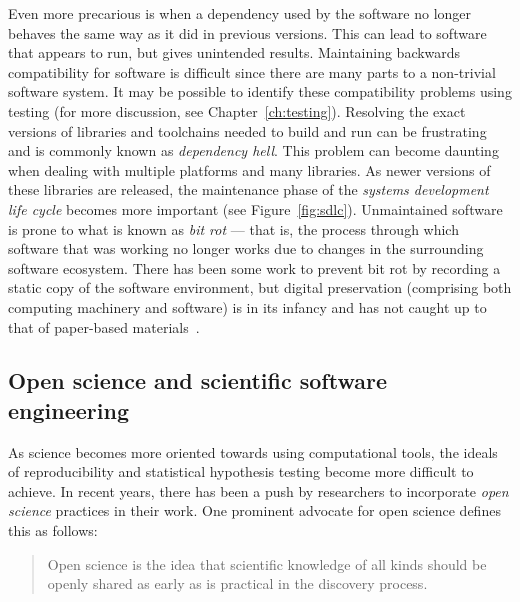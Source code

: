 { %
	Even more precarious is when a dependency used by the
	software no longer behaves the same way as it did in
	previous versions. This can lead to software that appears
	to run, but gives unintended results. Maintaining
	backwards compatibility for software is difficult since
	there are many parts to a non-trivial software system.
	It may be possible to identify these compatibility problems using
	testing (for more discussion, see Chapter~\ref{ch:testing}).
	Resolving the exact versions of libraries and toolchains
	needed to build and run can be frustrating and is commonly
	known as \emph{dependency hell}. This problem can become
	daunting when dealing with multiple platforms and many
	libraries. As newer versions of these libraries are
	released, the maintenance phase of the \emph{systems
	development life cycle} becomes more important (see Figure~\ref{fig:sdlc}).
	Unmaintained software is prone to what is known as
	\emph{bit rot} --- that is, the process through which
	software that was working no longer works due to changes
	in the surrounding software ecosystem.
	There has been some work to prevent bit rot by recording a
	static copy of the software environment, but digital
	preservation (comprising both computing machinery and
	software) is in its infancy and has not caught up to that
	of paper-based materials~\autocite{PreservingExe2013,Thain2015,Meng2015}.
}


\subsection{Open science and scientific software engineering}\label{subsec:open-science}

As science becomes more oriented towards using computational
tools, the ideals of reproducibility and statistical hypothesis
testing become more difficult to achieve. In recent years, there
has been a push by researchers to incorporate \emph{open science}
practices in their work. One prominent advocate for open science
defines this as follows:\vspace{-3.5\parskip}
\begin{quote}
	\begin{fancyquote}
	Open science is the idea that scientific knowledge of all kinds
	should be openly shared as early as is practical in the discovery
	process.
	\end{fancyquote}
\end{quote}

